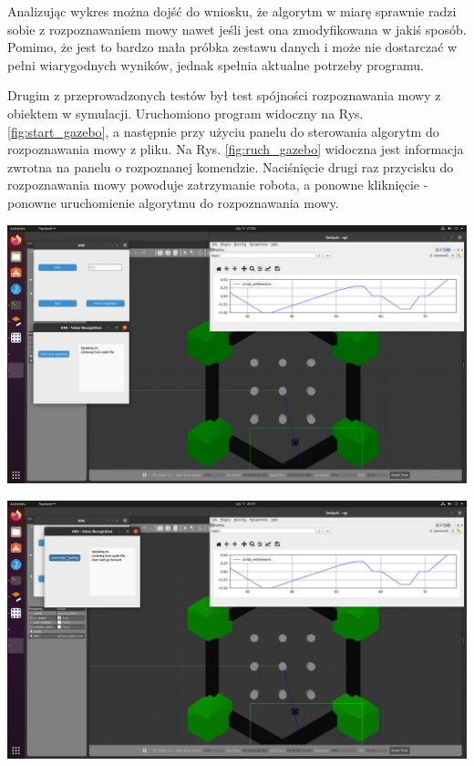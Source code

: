 Analizując wykres można dojść do wniosku, że algorytm w miarę sprawnie radzi sobie z rozpoznawaniem mowy nawet jeśli jest ona zmodyfikowana w jakiś sposób. Pomimo, że jest to bardzo mała próbka zestawu danych i może nie dostarczać w pełni wiarygodnych wyników, jednak spełnia aktualne potrzeby programu.

\vspace{10mm}

Drugim z przeprowadzonych testów był test spójności rozpoznawania mowy z obiektem w symulacji. Uruchomiono program widoczny na Rys.  \ref{fig:start_gazebo}, a następnie przy użyciu panelu do sterowania algorytm do rozpoznawania mowy z pliku. Na Rys. \ref{fig:ruch_gazebo} widoczna jest informacja zwrotna na panelu o rozpoznanej komendzie. Naciśnięcie drugi raz przycisku do rozpoznawania mowy powoduje zatrzymanie robota, a ponowne kliknięcie - ponowne uruchomienie algorytmu do rozpoznawania mowy.

\begin{center}
    \includegraphics[width=1\linewidth]{files/start.png}
    \label{fig:start_gazebo}
\end{center}
\vfill

\begin{center}
    \includegraphics[width=1\linewidth]{files/ruch.png}
    \label{fig:ruch_gazebo}
\end{center}

